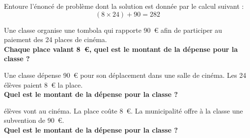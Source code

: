 Entoure l'énoncé de problème dont la solution est donnée par le calcul suivant :\[(8\times24)+90=282\]
\begin{multicols}{3}
Une classe organise une tombola qui rapporte 90~\textgreek{\euro} afin de participer au paiement des 24 places de cinéma.\\{\bf Chaque place valant 8~\textgreek{\euro}, quel est le montant de la dépense pour la classe ?}
\par\columnbreak Une classe dépense 90~\textgreek{\euro} pour son déplacement dans une salle de cinéma. Les 24 élèves paient 8~\textgreek{\euro} la place.\\{\bf Quel est le montant de la dépense pour la classe ?}
\par{} élèves vont au cinéma. La place coûte 8~\textgreek{\euro}. La municipalité offre à la classe une subvention de 90~\textgreek{\euro}.\\{\bf Quel est le montant de la dépense pour la classe ?}
\end{multicols}